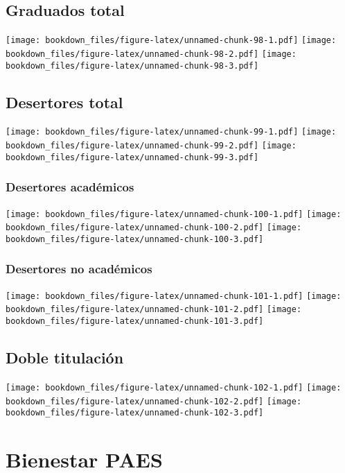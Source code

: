 \documentclass[]{article}
\theoremstyle{definition}
\theoremstyle{definition}
\theoremstyle{definition}
\theoremstyle{remark}
\begin{document}
\subsection{Graduados total}\label{graduados-total-1}

\texttt{[image: bookdown\_files/figure-latex/unnamed-chunk-98-1.pdf]}
\texttt{[image: bookdown\_files/figure-latex/unnamed-chunk-98-2.pdf]}
\texttt{[image: bookdown\_files/figure-latex/unnamed-chunk-98-3.pdf]}

\subsection{Desertores total}\label{desertores-total-1}

\texttt{[image: bookdown\_files/figure-latex/unnamed-chunk-99-1.pdf]}
\texttt{[image: bookdown\_files/figure-latex/unnamed-chunk-99-2.pdf]}
\texttt{[image: bookdown\_files/figure-latex/unnamed-chunk-99-3.pdf]}

\subsubsection{Desertores académicos}\label{desertores-academicos}

\texttt{[image: bookdown\_files/figure-latex/unnamed-chunk-100-1.pdf]}
\texttt{[image: bookdown\_files/figure-latex/unnamed-chunk-100-2.pdf]}
\texttt{[image: bookdown\_files/figure-latex/unnamed-chunk-100-3.pdf]}

\subsubsection{Desertores no académicos}\label{desertores-no-academicos}

\texttt{[image: bookdown\_files/figure-latex/unnamed-chunk-101-1.pdf]}
\texttt{[image: bookdown\_files/figure-latex/unnamed-chunk-101-2.pdf]}
\texttt{[image: bookdown\_files/figure-latex/unnamed-chunk-101-3.pdf]}

\subsection{Doble titulación}\label{doble-titulacion}

\texttt{[image: bookdown\_files/figure-latex/unnamed-chunk-102-1.pdf]}
\texttt{[image: bookdown\_files/figure-latex/unnamed-chunk-102-2.pdf]}
\texttt{[image: bookdown\_files/figure-latex/unnamed-chunk-102-3.pdf]}

\section{Bienestar PAES}\label{bienestar-paes}
\end{document}
